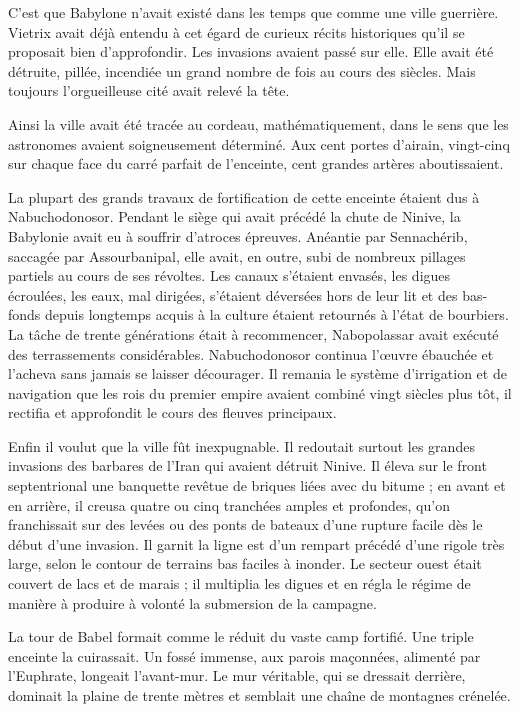 \documentclass[a4paper, 11pt, oneside, polutonikogreek, french]{article}
\begin{document}
C'est que Babylone n'avait existé dans les temps que comme une ville guerrière. Vietrix avait déjà entendu à cet égard de curieux récits historiques qu'il se proposait bien d'approfondir. Les invasions avaient passé sur elle. Elle avait été détruite, pillée, incendiée un grand nombre de fois au cours des siècles. Mais toujours l'orgueilleuse cité avait relevé la tête.

Ainsi la ville avait été tracée au cordeau, mathématiquement, dans le sens que les astronomes avaient soigneusement déterminé. Aux cent portes d'airain, vingt-cinq sur chaque face du carré parfait de l'enceinte, cent grandes artères aboutissaient.

\bigskip
\centerline{\EightStarTaper}
\centerline{\EightStarTaper\EightStarTaper}
\bigskip

La plupart des grands travaux de fortification de cette enceinte étaient dus à Nabuchodonosor. Pendant le siège qui avait précédé la chute de Ninive, la Babylonie avait eu à souffrir d'atroces épreuves. Anéantie par Sennachérib, saccagée par Assourbanipal, elle avait, en outre, subi de nombreux pillages partiels au cours de ses révoltes. Les canaux s'étaient envasés, les digues écroulées, les eaux, mal dirigées, s'étaient déversées hors de leur lit et des bas-fonds depuis longtemps acquis à la culture étaient retournés à l'état de bourbiers. La tâche de trente générations était à recommencer, Nabopolassar avait exécuté des terrassements considérables. Nabuchodonosor continua l'œuvre ébauchée et l'acheva sans jamais se laisser décourager. Il remania le système d'irrigation et de navigation que les rois du premier empire avaient combiné vingt siècles plus tôt, il rectifia et approfondit le cours des fleuves principaux.

Enfin il voulut que la ville fût inexpugnable. Il redoutait surtout les grandes invasions des barbares de l'Iran qui avaient détruit Ninive. Il éleva sur le front septentrional une banquette revêtue de briques liées avec du bitume ; en avant et en arrière, il creusa quatre ou cinq tranchées amples et profondes, qu'on franchissait sur des levées ou des ponts de bateaux d'une rupture facile dès le début d'une invasion. Il garnit la ligne est d'un rempart précédé d'une rigole très large, selon le contour de terrains bas faciles à inonder. Le secteur ouest était couvert de lacs et de marais ; il multiplia les digues et en régla le régime de manière à produire à volonté la submersion de la campagne.

La tour de Babel formait comme le réduit du vaste camp fortifié. Une triple enceinte la cuirassait. Un fossé immense, aux parois maçonnées, alimenté par l'Euphrate, longeait l'avant-mur. Le mur véritable, qui se dressait derrière, dominait la plaine de trente mètres et semblait une chaîne de montagnes crénelée.
\end{document}
